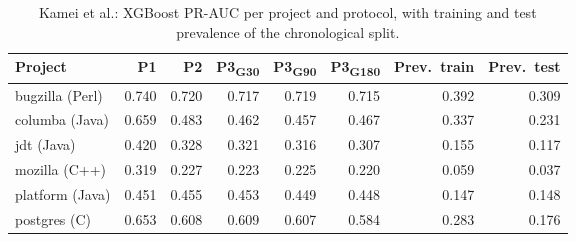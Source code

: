 \documentclass[11pt,a4paper]{article}
\begin{document}
\begin{table}[h]
\centering
\caption{Kamei et al.: XGBoost PR-AUC per project and protocol, with training and test prevalence of the chronological split.}
\label{tab:perprojectk}
\small
\begin{tabular}{lrrrrrrr}
\toprule
Project & P1 & P2 & P3\textsubscript{G30} & P3\textsubscript{G90} & P3\textsubscript{G180} & Prev.\ train & Prev.\ test \\
\midrule
bugzilla (Perl)   & 0.740 & 0.720 & 0.717 & 0.719 & 0.715 & 0.392 & 0.309 \\
columba (Java)    & 0.659 & 0.483 & 0.462 & 0.457 & 0.467 & 0.337 & 0.231 \\
jdt (Java)        & 0.420 & 0.328 & 0.321 & 0.316 & 0.307 & 0.155 & 0.117 \\
mozilla (C++)     & 0.319 & 0.227 & 0.223 & 0.225 & 0.220 & 0.059 & 0.037 \\
platform (Java)   & 0.451 & 0.455 & 0.453 & 0.449 & 0.448 & 0.147 & 0.148 \\
postgres (C)      & 0.653 & 0.608 & 0.609 & 0.607 & 0.584 & 0.283 & 0.176 \\
\bottomrule
\end{tabular}
\end{table}
\end{document}
